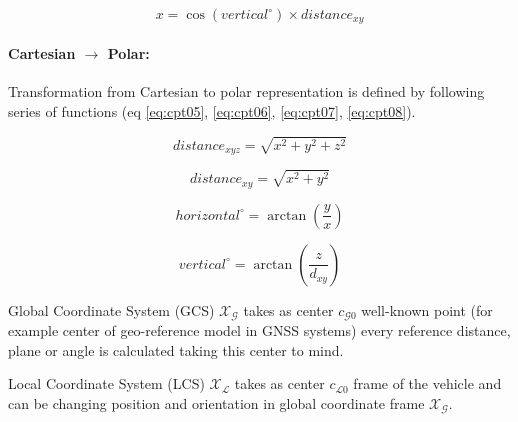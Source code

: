 \begin{equation}\label{eq:cpt04}
    x = \cos(vertical^\circ) \times distance_{xy}
\end{equation}


\paragraph{Cartesian $\to$ Polar:} Transformation from Cartesian to polar representation is defined by following series of functions (eq \ref{eq:cpt05}, \ref{eq:cpt06}, \ref{eq:cpt07}, \ref{eq:cpt08}).

\begin{equation}\label{eq:cpt05}
    distance_{xyz} = \sqrt{x^2+y^2+z^2}    
\end{equation}

\begin{equation}\label{eq:cpt06}
    distance_{xy} = \sqrt{x^2+y^2}    
\end{equation}

\begin{equation}\label{eq:cpt07}
    horizontal^\circ = \arctan\left(\frac{y}{x}\right)
\end{equation}

\begin{equation}\label{eq:cpt08}
    vertical^\circ =  \arctan \left( \frac{z}{d_{xy}}\right)
\end{equation}

\begin{definition}{Global Coordinate System (GCS) $\mathscr{X}_\mathscr{G}$}\label{def:globalCoordinateSystem}
    takes as center $c_{\mathscr{G}0}$ well-known point (for example center of geo-reference model in GNSS systems) every reference distance, plane or angle is calculated taking this center to mind.
\end{definition}

\begin{definition}{Local Coordinate System (LCS) $\mathscr{X}_\mathscr{L}$}\label{def:localCoordinateSystem}
    takes as center $c_{\mathscr{L}0}$ frame of the vehicle and can be changing position and orientation in global coordinate frame $\mathscr{X}_\mathscr{G}$.
\end{definition}

